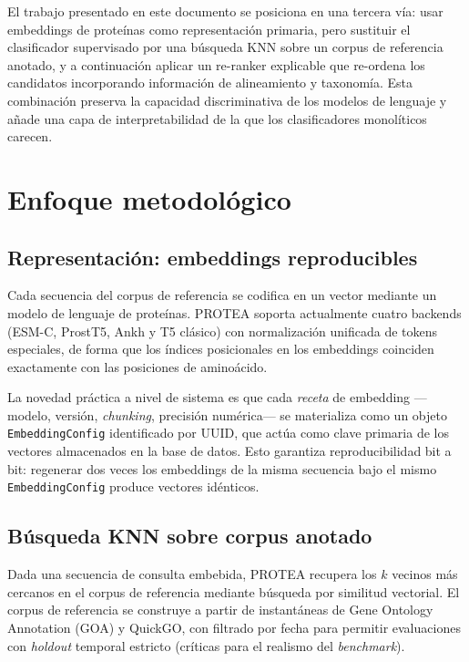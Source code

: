 \documentclass[11pt,a4paper]{article}
\begin{document}
El trabajo presentado en este documento se posiciona en una tercera vía: usar
embeddings de proteínas como representación primaria, pero sustituir el
clasificador supervisado por una búsqueda KNN sobre un corpus de referencia
anotado, y a continuación aplicar un re-ranker explicable que re-ordena los
candidatos incorporando información de alineamiento y taxonomía. Esta
combinación preserva la capacidad discriminativa de los modelos de lenguaje y
añade una capa de interpretabilidad de la que los clasificadores monolíticos
carecen.

\section{Enfoque metodológico}

\subsection{Representación: embeddings reproducibles}

Cada secuencia del corpus de referencia se codifica en un vector mediante un
modelo de lenguaje de proteínas. PROTEA soporta actualmente cuatro backends
(ESM-C, ProstT5, Ankh y T5 clásico) con normalización unificada de tokens
especiales, de forma que los índices posicionales en los embeddings coinciden
exactamente con las posiciones de aminoácido.

La novedad práctica a nivel de sistema es que cada \emph{receta} de embedding
—modelo, versión, \emph{chunking}, precisión numérica— se materializa como un
objeto \texttt{EmbeddingConfig} identificado por UUID, que actúa como clave
primaria de los vectores almacenados en la base de datos. Esto garantiza
reproducibilidad bit a bit: regenerar dos veces los embeddings de la misma
secuencia bajo el mismo \texttt{EmbeddingConfig} produce vectores idénticos.

\subsection{Búsqueda KNN sobre corpus anotado}

Dada una secuencia de consulta embebida, PROTEA recupera los $k$ vecinos más
cercanos en el corpus de referencia mediante búsqueda por similitud vectorial.
El corpus de referencia se construye a partir de instantáneas de Gene Ontology
Annotation (GOA) y QuickGO, con filtrado por fecha para permitir evaluaciones
con \emph{holdout} temporal estricto (críticas para el realismo del
\emph{benchmark}).
\end{document}
